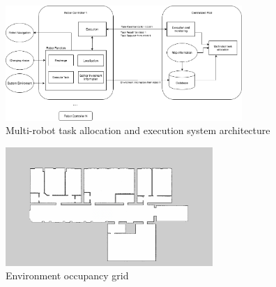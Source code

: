 \begin{figure}[htbp]
	\centering
	\includegraphics[width = 0.8\textwidth]{content/images/ch3/architecture.drawio.png}
	\caption{Multi-robot task allocation and execution system architecture}
	\label{fig:system_architecture}
\end{figure}

\begin{figure}[htbp]
	\centering
	\includegraphics[width = 0.7\textwidth]{content/images/ch3/occupancy_grid.png}
	\caption{Environment occupancy grid}
	\label{fig:occupancy_grid}
\end{figure}

